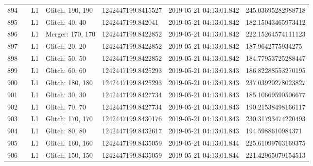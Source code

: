 \begin{longtable}{lllllll}
894  &                                                    &       L1 &  Glitch: 190, 190 &  1242447199.8415527 &  2019-05-21 04:13:01.842 &  245.03695282988718 \\
895  &                                                    &       L1 &    Glitch: 40, 40 &   1242447199.842041 &  2019-05-21 04:13:01.842 &  182.15043465973412 \\
896  &                                                    &       L1 &  Merger: 170, 170 &  1242447199.8422852 &  2019-05-21 04:13:01.842 &  222.15264574111123 \\
897  &                                                    &       L1 &    Glitch: 20, 20 &  1242447199.8422852 &  2019-05-21 04:13:01.842 &   187.9642775934275 \\
898  &                                                    &       L1 &    Glitch: 50, 50 &  1242447199.8422852 &  2019-05-21 04:13:01.842 &  184.77953725288447 \\
899  &                                                    &       L1 &    Glitch: 60, 60 &  1242447199.8425293 &  2019-05-21 04:13:01.843 &  186.82288553270195 \\
900  &                                                    &       L1 &  Glitch: 180, 180 &  1242447199.8425293 &  2019-05-21 04:13:01.843 &  237.03920278023827 \\
901  &                                                    &       L1 &    Glitch: 30, 30 &  1242447199.8427734 &  2019-05-21 04:13:01.843 &  185.10669590506677 \\
902  &                                                    &       L1 &    Glitch: 70, 70 &  1242447199.8427734 &  2019-05-21 04:13:01.843 &  190.21538498166117 \\
903  &                                                    &       L1 &  Glitch: 170, 170 &  1242447199.8430176 &  2019-05-21 04:13:01.843 &  230.31793474220493 \\
904  &                                                    &       L1 &    Glitch: 80, 80 &  1242447199.8432617 &  2019-05-21 04:13:01.843 &   194.5988610984371 \\
905  &                                                    &       L1 &  Glitch: 160, 160 &  1242447199.8435059 &  2019-05-21 04:13:01.844 &  225.61099763169375 \\
906  &                                                    &       L1 &  Glitch: 150, 150 &  1242447199.8435059 &  2019-05-21 04:13:01.844 &  221.42965079154513 \\

\end{longtable}
